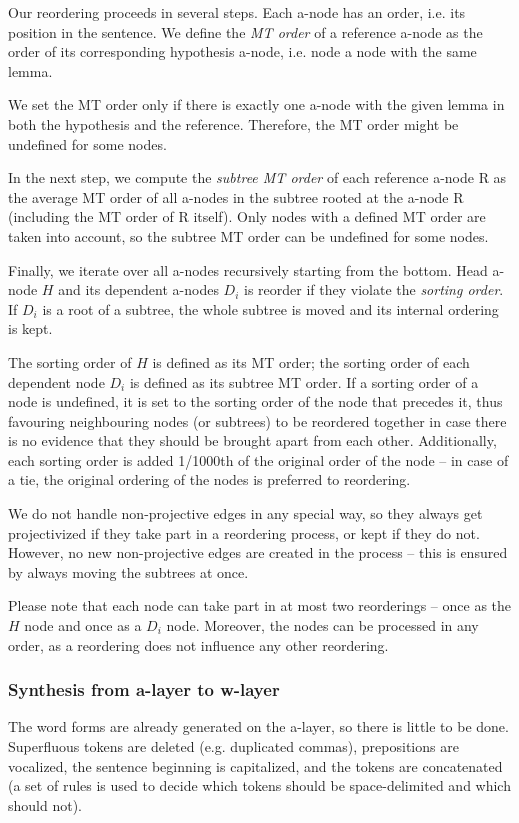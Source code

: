 \documentclass[11pt]{article}
\begin{document}
Our reordering proceeds in several steps. Each a-node has an order, i.e. its 
position in the sentence.  We define the \emph{MT order} of a reference 
a-node as the order of its corresponding hypothesis a-node, i.e. node a node 
with the same lemma. 

We set the MT order only if there is exactly one a-node with the given lemma 
in both the hypothesis and the reference. Therefore, the MT order might be 
undefined for some nodes.

In the next step, we compute the \emph{subtree MT order} of each reference 
a-node R as the average MT order of all a-nodes in the subtree rooted at the 
a-node R (including the MT order of R itself). Only nodes with a defined MT 
order are taken into account, so the subtree MT order can be undefined for 
some nodes. 

Finally, we iterate over all a-nodes recursively starting from the bottom. Head 
a-node $H$ and its dependent a-nodes $D_i$ is reorder if they violate the
\emph{sorting order}. If $D_i$ is a root of a subtree, the whole subtree is 
moved and its internal ordering is kept.

The sorting order of $H$ is defined as its MT order; the sorting order of each 
dependent node $D_i$ is defined as its subtree MT order. If a sorting order of 
a node is undefined, it is set to the sorting order of the node that precedes 
it, thus favouring neighbouring nodes (or subtrees) to be reordered together in 
case there is no evidence that they should be brought apart from each other. 
Additionally, each sorting order is added 1/1000th of the original order of the 
node -- in case of a tie, the original ordering of the nodes is preferred to 
reordering.

We do not handle non-projective edges in any special way, so they always get 
projectivized if they take part in a reordering process, or kept if they do
not. However, no new non-projective edges are created in the process – this is
ensured by always moving the subtrees at once.

Please note that each node can take part in at most two reorderings – once
as the $H$ node and once as a $D_i$ node. Moreover, the nodes can be processed 
in any order, as a reordering does not influence any other reordering.

\subsubsection{Synthesis from a-layer to w-layer}
The word forms are already generated on the a-layer, so there is little to be 
done. Superfluous tokens are deleted (e.g. duplicated commas), prepositions are
vocalized, the sentence beginning is capitalized, and the tokens are 
concatenated (a set of rules is used to decide which tokens should be
space-delimited and which should not).
\end{document}

